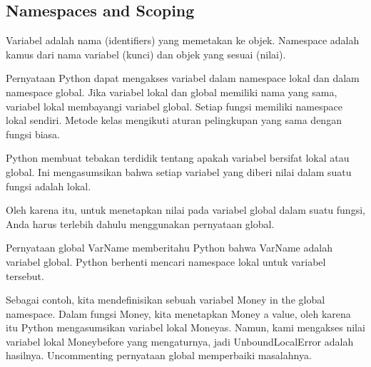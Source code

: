\documentclass[a4paper,12pt]{report}
\begin{document}
\subsection*{Namespaces and Scoping}
 \par
\begin{adjustwidth}{0.03in}{0.03in}
Variabel adalah nama (identifiers) yang memetakan ke objek. Namespace adalah kamus dari nama variabel (kunci) dan objek yang sesuai (nilai).\end{adjustwidth}
 \par
\begin{adjustwidth}{0.03in}{0.03in}
Pernyataan Python dapat mengakses variabel dalam namespace lokal dan dalam namespace global. Jika variabel lokal dan global memiliki nama yang sama, variabel lokal membayangi variabel global. Setiap fungsi memiliki namespace lokal sendiri. Metode kelas mengikuti aturan pelingkupan yang sama dengan fungsi biasa.\end{adjustwidth}
 \par
\begin{adjustwidth}{0.03in}{0.03in}
Python membuat tebakan terdidik tentang apakah variabel bersifat lokal atau global. Ini mengasumsikan bahwa setiap variabel yang diberi nilai dalam suatu fungsi adalah lokal.\end{adjustwidth}
 \par
\begin{adjustwidth}{0.03in}{0.03in}
Oleh karena itu, untuk menetapkan nilai pada variabel global dalam suatu fungsi, Anda harus terlebih dahulu menggunakan pernyataan global.\end{adjustwidth}
 \par
\begin{adjustwidth}{0.03in}{0.03in}
Pernyataan global VarName memberitahu Python bahwa VarName adalah variabel global. Python berhenti mencari namespace lokal untuk variabel tersebut.\end{adjustwidth}
 \par
\begin{adjustwidth}{0.03in}{0.03in}
Sebagai contoh, kita mendefinisikan sebuah variabel Money in the global namespace. Dalam fungsi Money, kita menetapkan Money a value, oleh karena itu Python mengasumsikan variabel lokal Moneyas. Namun, kami mengakses nilai variabel lokal Moneybefore yang mengaturnya, jadi UnboundLocalError adalah hasilnya. Uncommenting pernyataan global memperbaiki masalahnya.\end{adjustwidth}
 \par
\noindent 
\end{document}
